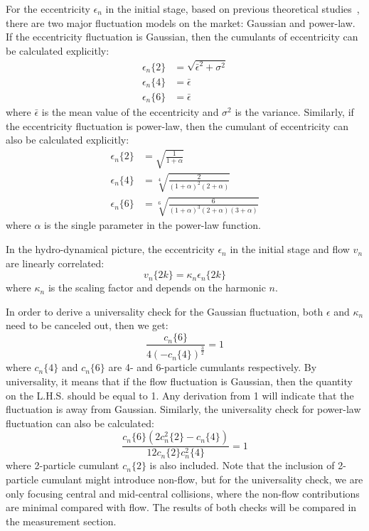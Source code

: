 For the eccentricity $\epsilon_{n}$ in the initial stage, based on previous theoretical studies~\cite{Yan:2013laa}, there are two major fluctuation models on the market: Gaussian and power-law. If the eccentricity fluctuation is Gaussian, then the cumulants of eccentricity can be calculated explicitly:
\begin{equation}
\begin{split}
\epsilon_{n}\{2\}&= \sqrt{\bar{\epsilon}^{2}+\sigma^{2}} \\
\epsilon_{n}\{4\}&= \bar{\epsilon} \\
\epsilon_{n}\{6\}&= \bar{\epsilon}
\end{split}
\end{equation}
where $\bar{\epsilon}$ is the mean value of the eccentricity and $\sigma^{2}$ is the variance. Similarly, if the eccentricity fluctuation is power-law, then the cumulant of eccentricity can also be calculated explicitly:
\begin{equation}
\begin{split}
\epsilon_{n}\{2\}&= \sqrt{\frac{1}{1+\alpha}} \\
\epsilon_{n}\{4\}&= \sqrt[4]{\frac{2}{(1+\alpha)^2(2+\alpha)}} \\
\epsilon_{n}\{6\}&= \sqrt[6]{\frac{6}{(1+\alpha)^3(2+\alpha)(3+\alpha)}}
\end{split}
\end{equation}
where $\alpha$ is the single parameter in the power-law function.

In the hydro-dynamical picture, the eccentricity $\epsilon_{n}$ in the initial stage and flow $v_{n}$ are linearly correlated:
\begin{equation}
v_{n}\{2k\}=\kappa_{n}\epsilon_{n}\{2k\}
\end{equation}
where $\kappa_{n}$ is the scaling factor and depends on the harmonic $n$.

In order to derive a universality check for the Gaussian fluctuation, both $\epsilon$ and $\kappa_{n}$ need to be canceled out, then we get:
\begin{equation}
\frac{c_n\{6\}}{4(-c_n\{4\})^{\frac{3}{2}}}=1
\end{equation}
where $c_n\{4\}$ and $c_n\{6\}$ are 4- and 6-particle cumulants respectively. By universality, it means that if the flow fluctuation is Gaussian, then the quantity on the L.H.S. should be equal to 1. Any derivation from 1 will indicate that the fluctuation is away from Gaussian. Similarly, the universality check for power-law fluctuation can also be calculated:
\begin{equation}
\frac{c_n\{6\}(2c_n^2\{2\}-c_n\{4\})}{12c_n\{2\}c_n^2\{4\}}=1
\end{equation}
where 2-particle cumulant $c_n\{2\}$ is also included. Note that the inclusion of 2-particle cumulant might introduce non-flow, but for the universality check, we are only focusing central and mid-central collisions, where the non-flow contributions are minimal compared with flow. The results of both checks will be compared in the measurement section.



